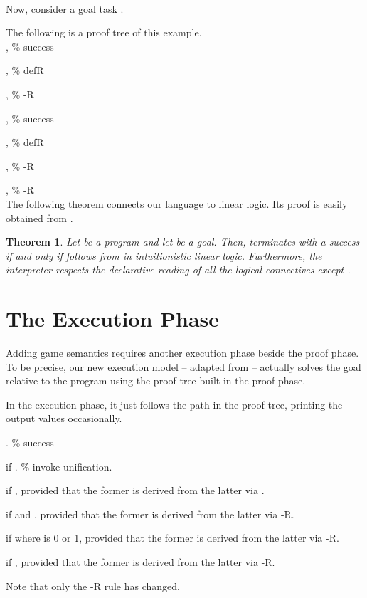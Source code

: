 \documentclass[letter]{ieice}
\newenvironment{numberedlist}
{\begin{list}{\makebox[20pt]{\hss(\arabic{itemno})\enspace}}
             {\usecounter{itemno}\labelwidth 20pt}}{\end{list}}
\newcounter{itemno}
\newcounter{itemno1}
\newcounter{itemno2}
\newcounter{lemma}
\newtheorem{theorem}[lemma]{Theorem}
\begin{document}
 \\


Now, consider a goal task 
 .
 
The following is a proof tree of this example.  \\


,  \% success

,  \% defR

,  \% -R

,  \% success

,   \% defR

,  \% -R

,  \% -R \\

The following theorem connects our language to linear logic.
Its proof is easily obtained from \cite{HM94}.


\begin{theorem}
 Let  be a program and 
let  be a goal. Then,  terminates with a success
 if and only if  follows from
 in intuitionistic linear logic. Furthermore, the interpreter respects the declarative
reading of all the logical connectives except .
\end{theorem}
 

\section{The Execution Phase}\label{sec:0627}

Adding game semantics  requires another execution phase beside the proof phase.
To be precise, our new execution model -- adapted from \cite{Jap03} -- 
 actually solves the goal relative to the program using the proof tree built in the proof
phase.

 In the execution phase, it just follows the path in the proof tree, printing the output values
occasionally.

\begin{numberedlist}





\item    . \% success

\item     if . \% invoke unification.

\item  if 
, provided that the former is derived from the latter via . 

\item   if  and 
, provided that the former is derived from the latter via -R.

\item   if  where  is 0 or 1, provided that the former
is derived from the latter via -R. 




\item   if , 
provided that the former
is derived from the latter via -R.




\end{numberedlist}
\noindent 
Note that only the -R rule has changed.
\end{document}
